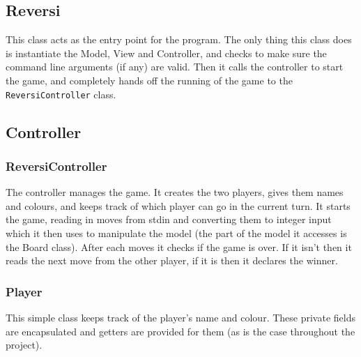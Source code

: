 \documentclass[11pt,a4paper,oneside]{article}
\begin{document}
\begin{figure}
\end{figure}

\subsection*{Reversi}
This class acts as the entry point for the program. The only thing this class does is instantiate the Model, View and Controller, and checks to make sure the command line arguments (if any) are valid. Then it calls the controller to start the game, and completely hands off the running of the game to the \texttt{ReversiController} class.

\subsection*{Controller}
\subsubsection*{ReversiController}
The controller manages the game. It creates the two players, gives them names and colours, and keeps track of which player can go in the current turn. It starts the game, reading in moves from stdin and converting them to integer input which it then uses to manipulate the model (the part of the model it accesses is the Board class). After each moves it checks if the game is over. If it isn't then it reads the next move from the other player, if it is then it declares the winner.

\subsubsection*{Player}
This simple class keeps track of the player's name and colour. These private fields are encapsulated and getters are provided for them (as is the case throughout the project).
\end{document}
